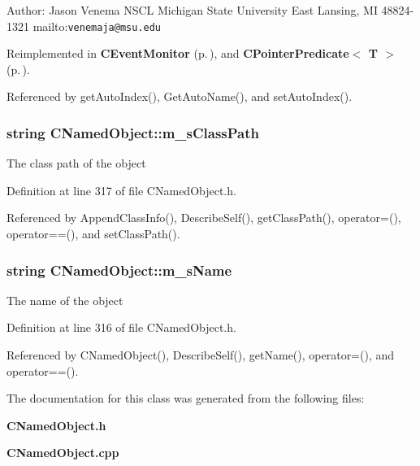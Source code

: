 Author: Jason Venema NSCL Michigan State University East Lansing, MI 48824-1321 mailto:{\tt venemaja@msu.edu} 

Reimplemented in {\bf CEvent\-Monitor} {\rm (p.\,\pageref{classCEventMonitor_r0})}, and {\bf CPointer\-Predicate$<$ T $>$} {\rm (p.\,\pageref{classCPointerPredicate_r0})}.

Referenced by get\-Auto\-Index(), Get\-Auto\-Name(), and set\-Auto\-Index().
\subsubsection{\setlength{\rightskip}{0pt plus 5cm}string CNamed\-Object::m\_\-s\-Class\-Path\hspace{0.3cm}{\tt  [private]}}\label{classCNamedObject_o1}


The class path of the object 

Definition at line 317 of file CNamed\-Object.h.

Referenced by Append\-Class\-Info(), Describe\-Self(), get\-Class\-Path(), operator=(), operator==(), and set\-Class\-Path().
\subsubsection{\setlength{\rightskip}{0pt plus 5cm}string CNamed\-Object::m\_\-s\-Name\hspace{0.3cm}{\tt  [private]}}\label{classCNamedObject_o0}


The name of the object 

Definition at line 316 of file CNamed\-Object.h.

Referenced by CNamed\-Object(), Describe\-Self(), get\-Name(), operator=(), and operator==().

The documentation for this class was generated from the following files:\begin{CompactItemize}
\item 
{\bf CNamed\-Object.h}\item 
{\bf CNamed\-Object.cpp}\end{CompactItemize}
